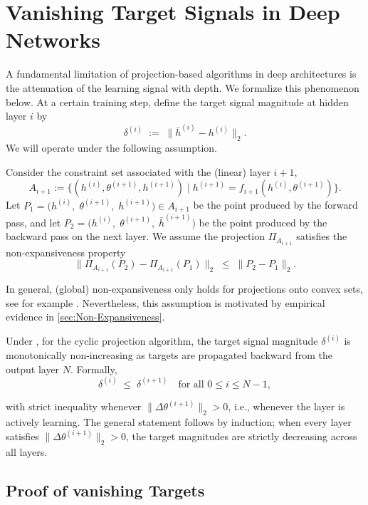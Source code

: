 \chapter{Vanishing Target Signals in Deep Networks}
\label{sec:vanishing-target}
A fundamental limitation of projection-based algorithms in deep architectures is the attenuation of the learning signal with depth. We formalize this phenomenon below. At a certain training step, define the target signal magnitude at hidden layer $i$ by
\[
\delta^{(i)} \;:=\; \bigl\|\bar{h}^{(i)} - h^{(i)}\bigr\|_2.
\]
We will operate under the following assumption.
\begin{assumption}
\label{ass:non-expansive}
Consider the constraint set associated with the (linear) layer $i+1$,
\[
    A_{i+1} := \{ (h^{(i)}, \theta^{(i+1)}, h^{(i+1)}) \mid h^{(i+1)} = f_{i+1}(h^{(i)}, \theta^{(i+1)}) \}.
\]
Let $P_1 = \bigl(h^{(i)},\; \theta^{(i+1)},\; h^{(i+1)}\bigr) \in A_{i+1}$ be the
point produced by the forward pass, and let
$P_2 = \bigl(h^{(i)},\; \theta^{(i+1)},\; \bar{h}^{(i+1)}\bigr)$ be the point
produced by the backward pass on the next layer. We assume the
projection $\Pi_{A_{i+1}}$ satisfies the non-expansiveness property
\[
    \|\Pi_{A_{i+1}}(P_2) - \Pi_{A_{i+1}}(P_1)\|_2 \;\leq\; \|P_2 - P_1\|_2.
\]
\end{assumption}

In general, (global) non-expansiveness only holds for projections onto convex sets, see for example \cite[Proposition 4.16]{bauschke2020correction}. Nevertheless, this assumption is motivated by empirical evidence in \cref{sec:Non-Expansiveness}.

Under , for the cyclic projection algorithm, the target signal magnitude $\delta^{(i)}$ 
is monotonically non-increasing as targets are propagated backward from the output layer $N$. Formally,
\[
\delta^{(i)} \;\leq\; \delta^{(i+1)} \quad \text{for all } 0 \leq i \leq N-1,
\]


with strict inequality whenever $\|\Delta \theta^{(i+1)}\|_2 > 0$, i.e., whenever the 
layer is actively learning. The general statement follows by induction; when every layer 
satisfies $\|\Delta \theta^{(i+1)}\|_2 > 0$, the target magnitudes are strictly 
decreasing across all layers.
\section{Proof of vanishing Targets}
\label{sec:proof-vanishing-targets}



